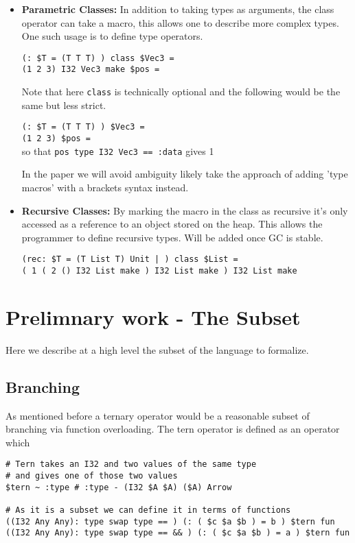 \documentclass{article}
\begin{document}
\begin{itemize}
\begin{itemize}
        \item \textbf{Parametric Classes:} In addition to taking types as arguments, the class operator can take a macro, this allows one to describe more complex types. One such usage is to define type operators.

        \texttt{(: \$T = (T T T) ) class \$Vec3 =}\\
        \texttt{(1 2 3) I32 Vec3 make \$pos =}

        Note that here \texttt{class} is technically optional and the following would be the same but less strict.

        \texttt{(: \$T = (T T T) ) \$Vec3 =}\\
        \texttt{(1 2 3) \$pos =}\\
        so that \texttt{pos type I32 Vec3 == :data} gives 1

        In the paper we will avoid ambiguity likely take the approach of adding 'type macros' with a brackets syntax instead.

        \item \textbf{Recursive Classes:} By marking the macro in the class as recursive it's only accessed as a reference to an object stored on the heap. This allows the programmer to define recursive types. Will be added once GC is stable.

        \texttt{(rec: \$T = (T List T) Unit | ) class \$List =}\\
        \texttt{( 1 ( 2 () I32 List make ) I32 List make ) I32 List make}
    \end{itemize}
\end{itemize}

\section{Prelimnary work - The Subset}
Here we describe at a high level the subset of the language to formalize.

\subsection{Branching}
As mentioned before a ternary operator would be a reasonable subset of branching via function overloading. The tern operator is defined as an operator which 

\begin{verbatim}
# Tern takes an I32 and two values of the same type
# and gives one of those two values
$tern ~ :type # :type - (I32 $A $A) ($A) Arrow

# As it is a subset we can define it in terms of functions
((I32 Any Any): type swap type == ) (: ( $c $a $b ) = b ) $tern fun
((I32 Any Any): type swap type == && ) (: ( $c $a $b ) = a ) $tern fun
\end{verbatim}
\end{document}
